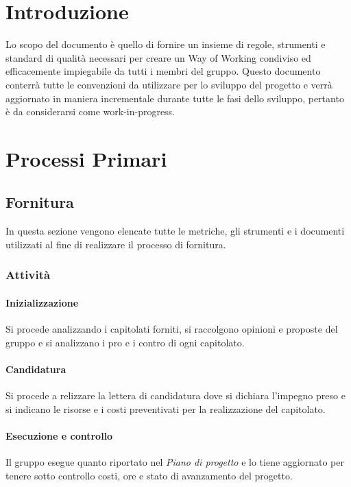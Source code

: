 \documentclass[12pt]{article}
\begin{document}
\tableofcontents

\pagebreak

\printindex


\section{Introduzione}
Lo scopo del documento è quello di fornire un insieme di regole, strumenti e standard di qualità necessari per creare un Way of Working condiviso ed efficacemente impiegabile da tutti i membri del gruppo.
Questo documento conterrà tutte le convenzioni da utilizzare per lo sviluppo del progetto e verrà aggiornato in maniera incrementale durante tutte le fasi dello sviluppo, pertanto è da considerarsi come work-in-progress.


\section{Processi Primari}
\subsection{Fornitura}
In questa sezione vengono elencate tutte le metriche, gli strumenti e i documenti utilizzati al fine di
realizzare il processo di fornitura.


\subsubsection{Attività}
\paragraph{Inizializzazione}
Si procede analizzando i capitolati forniti, si raccolgono opinioni e proposte del gruppo e si analizzano i pro e i contro di ogni capitolato.

\paragraph{Candidatura}
Si procede a relizzare la lettera di candidatura dove si dichiara l'impegno preso e si indicano le risorse e i costi preventivati per la realizzazione del capitolato.

\paragraph{Esecuzione e controllo}
Il gruppo esegue quanto riportato nel \textit{Piano di progetto} e lo tiene aggiornato per tenere sotto controllo costi, ore e stato di avanzamento del progetto.
\end{document}
